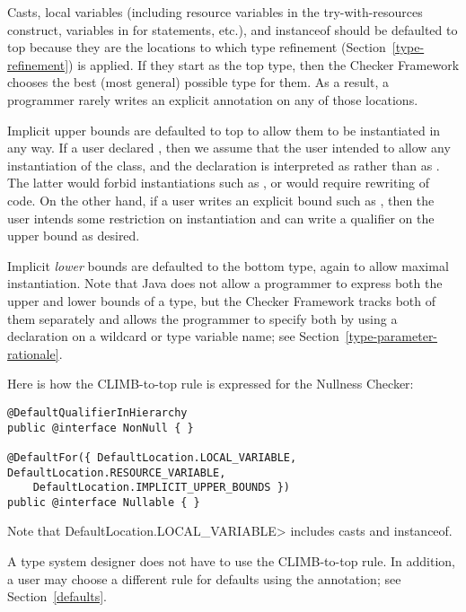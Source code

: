 
Casts, local variables (including resource variables in the
try-with-resources construct, variables in for statements, etc.), and
instanceof should be defaulted to top because they are the locations to
which type refinement (Section~\ref{type-refinement}) is applied.  If they
start as the top type, then the Checker Framework chooses the best (most
general) possible type for them.  As a result, a programmer rarely writes
an explicit annotation on any of those locations.

Implicit upper bounds are defaulted to top to allow them to be instantiated
in any way.  If a user declared , then
we assume that the user intended to allow any instantiation of the class,
and the declaration is interpreted as  rather than as .  The latter would forbid
instantiations such as , or would require
rewriting of code.  On the other hand, if a user writes an explicit bound
such as , then the user
intends some restriction on instantiation and can write a qualifier on the
upper bound as desired.

Implicit \emph{lower} bounds are defaulted to the bottom type, again to allow
maximal instantiation.  Note that Java does not allow a programmer to
express both the upper and lower bounds of a type, but the Checker
Framework tracks both of them separately and allows the programmer to
specify both by using a declaration on a wildcard or type variable name;
see Section~\ref{type-parameter-rationale}.


Here is how the CLIMB-to-top rule is expressed for the Nullness Checker:

\begin{Verbatim}
@DefaultQualifierInHierarchy
public @interface NonNull { }

@DefaultFor({ DefaultLocation.LOCAL_VARIABLE, DefaultLocation.RESOURCE_VARIABLE,
    DefaultLocation.IMPLICIT_UPPER_BOUNDS })
public @interface Nullable { }
\end{Verbatim}

\noindent
Note that \<DefaultLocation.LOCAL\_VARIABLE> includes casts and instanceof.

A type system designer does not have to use the CLIMB-to-top rule.  In
addition, a user may choose a different rule for defaults using the
 annotation; see
Section~\ref{defaults}.


